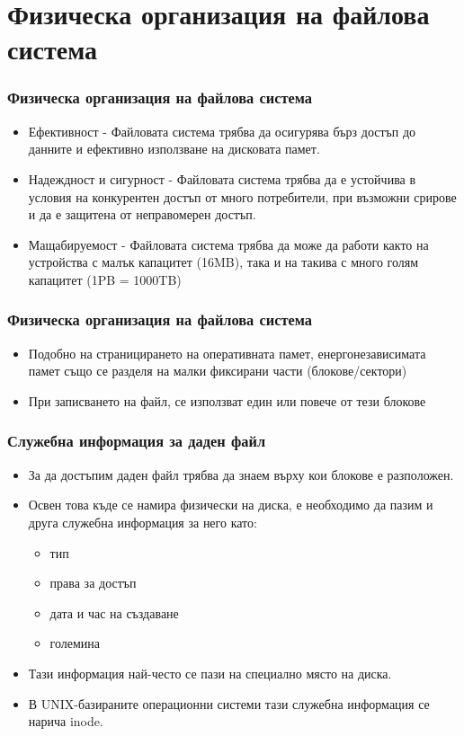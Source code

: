 \documentclass[ignorenonframetext, hyperref=unicode]{beamer}
\begin{document}
\section{Физическа организация на файлова система}

\begin{frame}
\frametitle{Физическа организация на файлова система}
\begin{itemize}
  \item Ефективност - Файловата система трябва да осигурява бърз достъп до данните и ефективно използване на дисковата памет.
  \item Надеждност и сигурност - Файловата система трябва да е устойчива в условия на конкурентен достъп от много потребители, при възможни срирове и да е защитена от неправомерен достъп.
  \item Мащабируемост - Файловата система трябва да може да работи както на устройства с малък капацитет (16MB), така и на такива с много голям капацитет (1PB = 1000TB)
\end{itemize}
\end{frame}

\begin{frame}
\frametitle{Физическа организация на файлова система}
\begin{itemize}
  \item Подобно на страницирането на оперативната памет, енергонезависимата памет също се разделя на малки фиксирани части (блокове/сектори)
  \item При записването на файл, се използват един или повече от тези блокове
\end{itemize}
\end{frame}

\begin{frame}
\frametitle{Служебна информация за даден файл}
\begin{itemize}
  \item За да достъпим даден файл трябва да знаем върху кои блокове е разположен.
  \item Освен това къде се намира физически на диска, е необходимо да пазим и друга служебна информация за него като:
  \begin{itemize}
		\item тип
		\item права за достъп
		\item дата и час на създаване
		\item големина
  \end{itemize}
  \item Тази информация най-често се пази на специално място на диска.
  \item В UNIX-базираните операционни системи тази служебна информация се нарича inode.
\end{itemize}
\end{frame}
\end{document}
